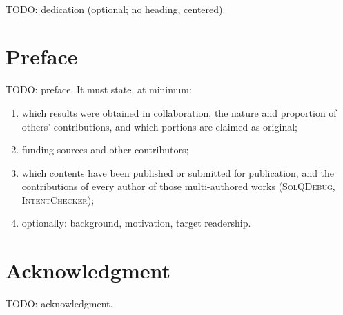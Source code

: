 \documentclass[11pt,oneside]{report}
\theoremstyle{plain}
\theoremstyle{definition}
\theoremstyle{remark}
\newcommand{\solq}{\textsc{SolQDebug}}
\newcommand{\ichk}{\textsc{IntentChecker}}
\begin{document}
\newpage
~
\vspace{5.5cm}\par
\begin{center}
TODO: dedication (optional; no heading, centered).
\end{center}

\newpage
\chapter*{Preface}
\normalsize

TODO: preface. It must state, at minimum:
\begin{enumerate}[leftmargin=*]
\item which results were obtained in collaboration, the nature and proportion of
      others' contributions, and which portions are claimed as original;
\item funding sources and other contributors;
\item which contents have been \underline{published or submitted for publication},
      and the contributions of every author of those multi-authored works
      (\solq{}, \ichk{});
\item optionally: background, motivation, target readership.
\end{enumerate}

\newpage
\chapter*{Acknowledgment}

TODO: acknowledgment.

\newpage
\renewcommand*\contentsname{Table of Contents}
{}
\tableofcontents

\newpage
{}
{}
\listoftables
\end{document}
